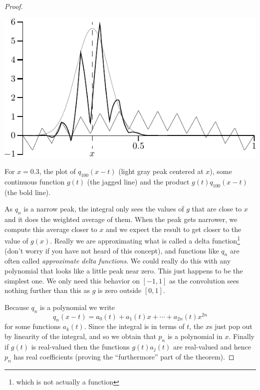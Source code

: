 \begin{proof}
\begin{myfigureht}
\includegraphics{figures/approxdeltaconv}
\caption{For $x=0.3$, the plot of $q_{100}(x-t)$ (light gray peak centered
at $x$), some continuous function
$g(t)$ (the jagged line) and the product $g(t)q_{100}(x-t)$ (the bold line).\label{fig:approxdeltaconv}}
\end{myfigureht}

As $q_n$ is a narrow peak, the integral
only sees the values of $g$ that are
close to $x$ and it does the weighted average of them.
When the peak gets narrower, we compute this average closer to $x$
and we expect the result to get closer to the value of $g(x)$.  Really we are
approximating what is called a delta function\footnote{which is not actually
a function} (don't worry if you have not
heard of this concept),
and functions like $q_n$ are often called
\emph{approximate delta functions}.
We could really do this with any polynomial that looks like a little peak
near zero.  This just happens to be the simplest one.
We only need this behavior on $[-1,1]$ as the convolution sees nothing
further than this as $g$ is zero outside $[0,1]$.

Because $q_n$ is a polynomial we write
\begin{equation*}
q_n(x-t) = a_0(t) + a_1(t)x + \cdots + a_{2n}(t) x^{2n}
\end{equation*}
for some functions $a_k(t)$.
Since the integral is in terms of $t$, the $x$s just pop out
by linearity of the integral,
and so we obtain that $p_n$ is a polynomial in $x$.
Finally if $g(t)$ is real-valued then the functions $g(t)a_j(t)$ are
real-valued and hence $p_n$ has real coefficients
(proving the ``furthermore'' part of the theorem).


\end{proof}
